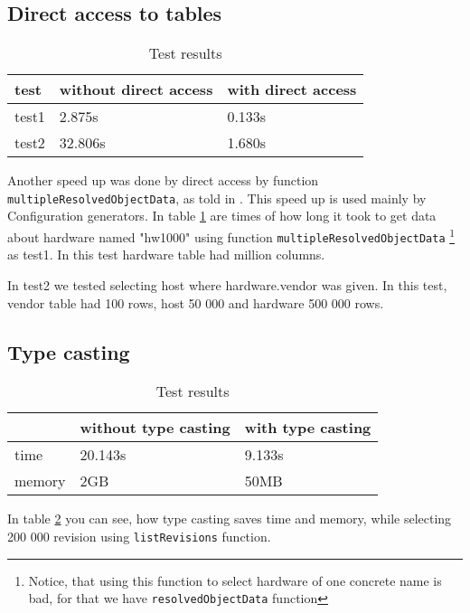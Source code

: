 \documentclass[deska]{subfiles}
\begin{document}
\subsection{Direct access to tables}
\label{sec:test-direct}


\begin{longtable}{ l | l | l }
\caption{Test results}\\
test & without direct access & with direct access \\
\hline
\endhead
\label{tbl:test-direct}
test1 & 2.875s & 0.133s \\
test2 & 32.806s & 1.680s \\
\end{longtable}

Another speed up was done by direct access by function {\tt multipleResolvedObjectData}, as told in .
This speed up is used mainly by Configuration generators.
In table \ref{tbl:test-direct} are times of how long it took to get data about hardware named "hw1000" using function {\tt multipleResolvedObjectData}
\footnote{Notice, that using this function to select hardware of one concrete name is bad, for that we have
{\tt resolvedObjectData} function}
as test1. In this test hardware table had million columns.

In test2 we tested selecting host where hardware.vendor was given. In this test, vendor table
had 100 rows, host 50 000 and hardware 500 000 rows.

\subsection{Type casting}
\label{sec:test-cast}

\begin{longtable}{ l | l | l }
\caption{Test results}\\
& without type casting & with type casting \\
\hline
\endhead
\label{tbl:test-casting-cmp}
time & 20.143s & 9.133s \\
memory & 2GB & 50MB \\
\end{longtable}

In table \ref{tbl:test-casting-cmp} you can see, how type casting saves time and memory,
while selecting 200 000 revision using {\tt listRevisions} function.
\end{document}
